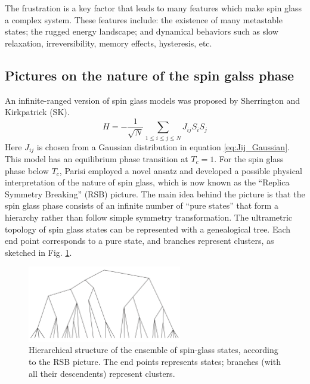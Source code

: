 The frustration is a key factor that leads to many features which make 
spin glass a complex system.
These features include: the existence of many metastable states; the rugged energy 
landscape; and dynamical behaviors such as slow relaxation, irreversibility, 
memory effects, hysteresis, etc. 


\subsection{Pictures on the nature of the spin galss phase}
\label{sec:meanfield-model}

An infinite-ranged version of spin glass models 
was proposed by Sherrington and Kirkpatrick (SK).
\begin{equation}
  \label{eq:SK}
  H=-\frac{1}{\sqrt{N}}\sum_{1\le i\le j\le N}J_{ij}S_iS_j
\end{equation}
Here $J_{ij}$ is chosen from a Gaussian distribution in equation 
\ref{eq:Jij_Gaussian}.
This model has an equilibrium phase transition at $T_c = 1$.
For the spin glass phase below $T_c$, Parisi employed a novel ansatz and 
developed a  possible physical interpretation of the nature of spin glass, 
which is now known as the ``Replica Symmetry Breaking'' (RSB) picture. The main
idea behind the picture is that the spin glass phase consists of an infinite 
number of ``pure states'' that form a hierarchy rather than follow simple symmetry
transformation. 
The ultrametric topology of spin glass states can be represented with a 
genealogical tree. Each end point corresponds to a pure state, and branches 
represent clusters, as sketched in Fig. \ref{fig:TreeRSB}. 


\begin{figure}[!h]
  \label{fig:TreeRSB}
  \centering
  \includegraphics[width=0.6\textwidth]{img/TreeRSB.png}
  \caption{Hierarchical structure of the ensemble of spin-glass states, according
to the RSB picture. The end points represents states; branches (with all their descendents)
represent clusters.}
\end{figure}


